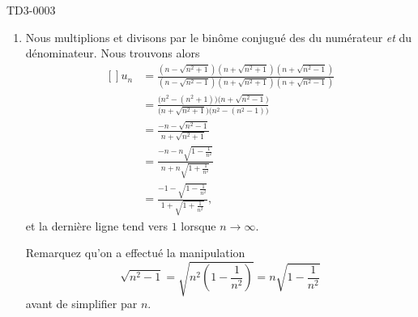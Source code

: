 \begin{corrige}{TD3-0003}
\begin{enumerate}
		\item
			Nous multiplions et divisons par le binôme conjugué des du numérateur \emph{et} du dénominateur. Nous trouvons alors
			\begin{equation}
				\begin{aligned}[]
					u_n&=\frac{ ( n-\sqrt{n^2+1} )( n+\sqrt{n^2+1} )( n+\sqrt{n^2-1} ) }{ (n-\sqrt{n^2-1})(n+\sqrt{n^2+1})(n+\sqrt{n^2-1}) }\\
					&=\frac{ \big( n^2-(n^2+1) \big)\big( n+\sqrt{n^2-1} \big) }{ \big( n+\sqrt{n^2+1} \big)\big( n^2-(n^2-1) \big) }\\
					&=\frac{ -n-\sqrt{n^2-1} }{ n+\sqrt{n^2+1} }\\
					&=\frac{ -n-n\sqrt{1-\frac{1}{ n^2 }} }{ n+n\sqrt{1+\frac{1}{ n^2 }} }\\
					&=\frac{ -1-\sqrt{1-\frac{1}{ n^2 }} }{ 1+\sqrt{1+\frac{1}{ n^2 }} },
				\end{aligned}
			\end{equation}
			et la dernière ligne tend vers $1$ lorsque $n\to\infty$.

			Remarquez qu'on a effectué la manipulation
			\begin{equation}
				\sqrt{n^2-1}=\sqrt{n^2\left( 1-\frac{1}{ n^2 } \right)}=n\sqrt{1-\frac{1}{ n^2 }}
			\end{equation}
			avant de simplifier par $n$.
	\end{enumerate}
	

\end{corrige}




